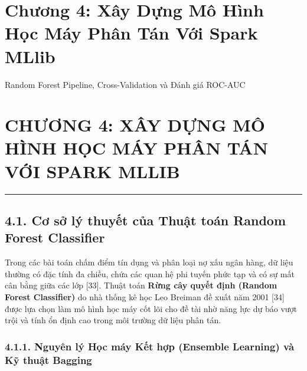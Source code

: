 \documentclass[
  13pt,
  a4paper,
]{report}
\begin{document}

\chapter{Chương 4: Xây Dựng Mô Hình Học Máy Phân Tán Với Spark
MLlib}\label{chux1b0ux1a1ng-4-xuxe2y-dux1ef1ng-muxf4-huxecnh-hux1ecdc-muxe1y-phuxe2n-tuxe1n-vux1edbi-spark-mllib}

Random Forest Pipeline, Cross-Validation và Đánh giá ROC-AUC

\hfill\break


\chapter{CHƯƠNG 4: XÂY DỰNG MÔ HÌNH HỌC MÁY PHÂN TÁN VỚI SPARK
MLLIB}\label{chux1b0ux1a1ng-4-xuxe2y-dux1ef1ng-muxf4-huxecnh-hux1ecdc-muxe1y-phuxe2n-tuxe1n-vux1edbi-spark-mllib-1}

\begin{center}\rule{0.5\linewidth}{0.5pt}\end{center}

\section{4.1. Cơ sở lý thuyết của Thuật toán Random Forest
Classifier}\label{cux1a1-sux1edf-luxfd-thuyux1ebft-cux1ee7a-thuux1eadt-touxe1n-random-forest-classifier}

Trong các bài toán chấm điểm tín dụng và phân loại nợ xấu ngân hàng, dữ
liệu thường có đặc tính đa chiều, chứa các quan hệ phi tuyến phức tạp và
có sự mất cân bằng giữa các lớp {[}33{]}. Thuật toán \textbf{Rừng cây
quyết định (Random Forest Classifier)} do nhà thống kê học Leo Breiman
đề xuất năm 2001 {[}34{]} được lựa chọn làm mô hình học máy cốt lõi cho
đề tài nhờ năng lực dự báo vượt trội và tính ổn định cao trong môi
trường dữ liệu phân tán.

\subsection{4.1.1. Nguyên lý Học máy Kết hợp (Ensemble Learning) và Kỹ
thuật
Bagging}\label{nguyuxean-luxfd-hux1ecdc-muxe1y-kux1ebft-hux1ee3p-ensemble-learning-vuxe0-kux1ef9-thuux1eadt-bagging}
\end{document}
